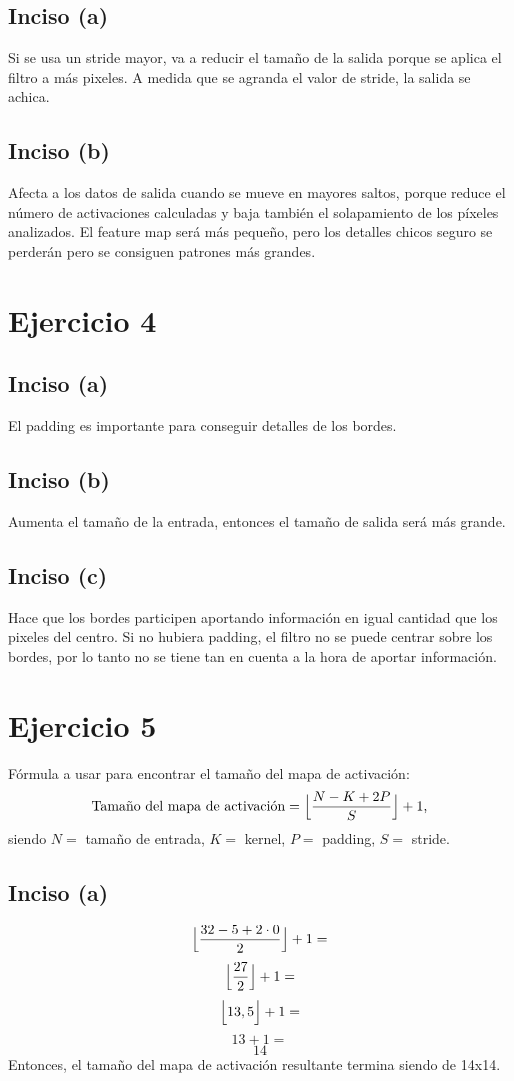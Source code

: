 \documentclass[12pt, a4paper]{article}
\begin{document}
        \subsection*{Inciso (a)}
            \noindent Si se usa un stride mayor, va a reducir el tamaño de la salida porque se aplica el filtro a más pixeles. A medida que se agranda el valor de stride, la salida se achica.
        \subsection*{Inciso (b)}
            \noindent Afecta a los datos de salida cuando se mueve en mayores saltos, porque reduce el número de activaciones calculadas y baja también el solapamiento de los píxeles analizados. El feature map será más pequeño, pero los detalles chicos seguro se perderán pero se consiguen patrones más grandes.
    \section*{Ejercicio 4}
        \subsection*{Inciso (a)}
            \noindent El padding es importante para conseguir detalles de los bordes.
        \subsection*{Inciso (b)}
            \noindent Aumenta el tamaño de la entrada, entonces el tamaño de salida será más grande.
        \subsection*{Inciso (c)}
            \noindent Hace que los bordes participen aportando información en igual cantidad que los pixeles del centro. Si no hubiera padding, el filtro no se puede centrar sobre los bordes, por lo tanto no se tiene tan en cuenta a la hora de aportar información.
    \section*{Ejercicio 5}
        \noindent Fórmula a usar para encontrar el tamaño del mapa de activación: \[\text{Tamaño del mapa de activación} = \Bigl\lfloor\frac{N-K+2P}{S}\Bigr\rfloor + 1 \text{,}\] siendo $N = $ tamaño de entrada, $K = $ kernel, $P = $ padding, $S = $ stride. 
        \subsection*{Inciso (a)}
            \[\Bigl\lfloor\frac{32 - 5 + 2 \cdot 0}{2}\Bigr\rfloor + 1 =\]
            \[\Bigl\lfloor\frac{27}{2}\Bigr\rfloor + 1 =\]
            \[\Bigl\lfloor 13,5 \Bigr\rfloor + 1 =\]
            \[13 + 1 =\]
            \[14\]
            \noindent Entonces, el tamaño del mapa de activación resultante termina siendo de 14x14.
\end{document}
